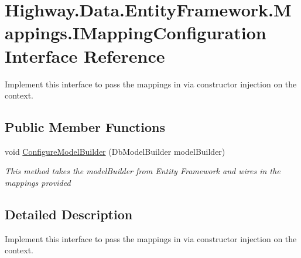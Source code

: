 \hypertarget{interface_highway_1_1_data_1_1_entity_framework_1_1_mappings_1_1_i_mapping_configuration}{\section{Highway.\-Data.\-Entity\-Framework.\-Mappings.\-I\-Mapping\-Configuration Interface Reference}
\label{interface_highway_1_1_data_1_1_entity_framework_1_1_mappings_1_1_i_mapping_configuration}
}


Implement this interface to pass the mappings in via constructor injection on the context.  


\subsection*{Public Member Functions}
\begin{DoxyCompactItemize}
\item 
void \hyperlink{interface_highway_1_1_data_1_1_entity_framework_1_1_mappings_1_1_i_mapping_configuration_a84ae8af129375228ed45a1538cceb06e}{Configure\-Model\-Builder} (Db\-Model\-Builder model\-Builder)
\begin{DoxyCompactList}\small\item\em This method takes the model\-Builder from Entity Framework and wires in the mappings provided \end{DoxyCompactList}\end{DoxyCompactItemize}


\subsection{Detailed Description}
Implement this interface to pass the mappings in via constructor injection on the context. 



